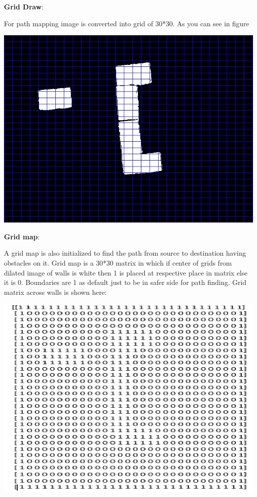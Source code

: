 \documentclass[report]{res}
\begin{document}
	\pagebreak	
	
	
	\textbf{Grid Draw}:
	
	For path mapping image is converted into grid of 30*30. As you can see in figure 
	
	\begin{center}
	\includegraphics[scale = 0.8]{graphics/case1/walls_mask11.jpg}\\
	\end{center}
	
	\pagebreak
	
	
	\textbf{Grid map}:
	
	A grid map is also initialized to find the path from source to destination having obstacles on it. Grid map is a 30*30 matrix in which if center of grids from dilated image of walls is white then 1 is placed at respective place in matrix else it is 0. Boundaries are 1 as default just to be in safer side for path finding. Grid matrix across walls is shown here:\\
	
	\begin{center}
	\includegraphics[scale = 0.8]{graphics/grid_map.png}\\
	\end{center}
	
\end{document}
